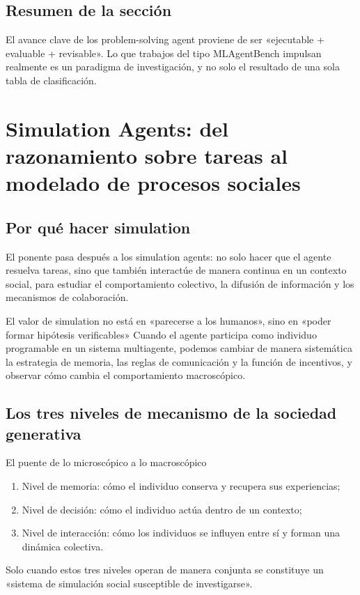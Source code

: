 \documentclass[a4paper]{article}
\begin{document}
\subsection{Resumen de la sección}
El avance clave de los problem-solving agent proviene de ser «ejecutable + evaluable + revisable». Lo que trabajos del tipo MLAgentBench impulsan realmente es un paradigma de investigación, y no solo el resultado de una sola tabla de clasificación.

\section{Simulation Agents: del razonamiento sobre tareas al modelado de procesos sociales}

\subsection{Por qué hacer simulation}
El ponente pasa después a los simulation agents: no solo hacer que el agente resuelva tareas, sino que también interactúe de manera continua en un contexto social, para estudiar el comportamiento colectivo, la difusión de información y los mecanismos de colaboración.

\begin{importantbox}{El valor de simulation no está en «parecerse a los humanos», sino en «poder formar hipótesis verificables»}
Cuando el agente participa como individuo programable en un sistema multiagente, podemos cambiar de manera sistemática la estrategia de memoria, las reglas de comunicación y la función de incentivos, y observar cómo cambia el comportamiento macroscópico.
\end{importantbox}

\subsection{Los tres niveles de mecanismo de la sociedad generativa}
\begin{knowledgebox}{El puente de lo microscópico a lo macroscópico}
\begin{enumerate}
    \item Nivel de memoria: cómo el individuo conserva y recupera sus experiencias;
    \item Nivel de decisión: cómo el individuo actúa dentro de un contexto;
    \item Nivel de interacción: cómo los individuos se influyen entre sí y forman una dinámica colectiva.
\end{enumerate}
Solo cuando estos tres niveles operan de manera conjunta se constituye un «sistema de simulación social susceptible de investigarse».
\end{knowledgebox}
\end{document}
